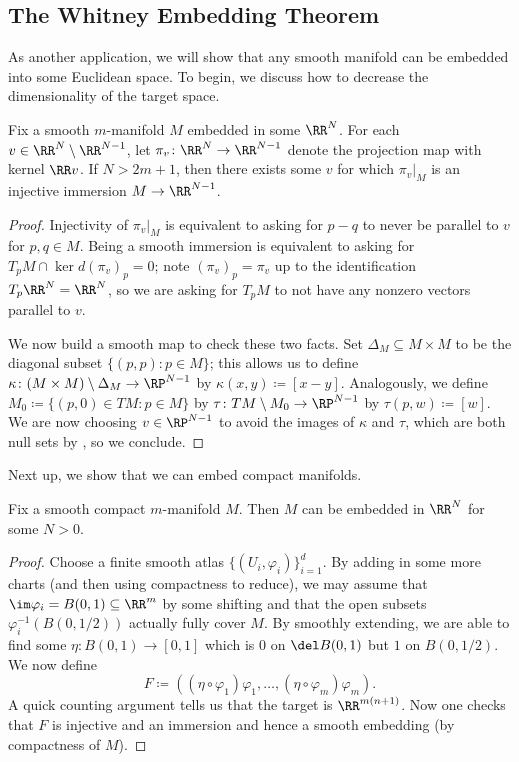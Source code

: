 \documentclass[../notes.tex]{subfiles}
\begin{document}
\subsection{The Whitney Embedding Theorem}
As another application, we will show that any smooth manifold can be embedded into some Euclidean space. To begin, we discuss how to decrease the dimensionality of the target space.
\begin{lemma}
	Fix a smooth $m$-manifold $M$ embedded in some $\RR^N$. For each $v\in\RR^N\setminus\RR^{N-1}$, let $\pi_v\colon\RR^N\to\RR^{N-1}$ denote the projection map with kernel $\RR v$. If $N>2m+1$, then there exists some $v$ for which $\pi_v|_M$ is an injective immersion $M\to\RR^{N-1}$.
\end{lemma}
\begin{proof}
	Injectivity of $\pi_v|_M$ is equivalent to asking for $p-q$ to never be parallel to $v$ for $p,q\in M$. Being a smooth immersion is equivalent to asking for $T_pM\cap\ker d(\pi_v)_p=0$; note $(\pi_v)_p=\pi_v$ up to the identification $T_p\RR^N=\RR^N$, so we are asking for $T_pM$ to not have any nonzero vectors parallel to $v$.

	We now build a smooth map to check these two facts. Set $\Delta_M\subseteq M\times M$ to be the diagonal subset $\{(p,p):p\in M\}$; this allows us to define $\kappa\colon(M\times M)\setminus\Delta_M\to\RP^{N-1}$ by $\kappa(x,y)\coloneqq[x-y]$. Analogously, we define $M_0\coloneqq\{(p,0)\in TM:p\in M\}$ by $\tau\colon TM\setminus M_0\to\RP^{N-1}$ by $\tau(p,w)\coloneqq[w]$. We are now choosing $v\in\RP^{N-1}$ to avoid the images of $\kappa$ and $\tau$, which are both null sets by , so we conclude.
\end{proof}
Next up, we show that we can embed compact manifolds.
\begin{lemma}
	Fix a smooth compact $m$-manifold $M$. Then $M$ can be embedded in $\RR^N$ for some $N>0$.
\end{lemma}
\begin{proof}
	Choose a finite smooth atlas $\{(U_i,\varphi_i)\}_{i=1}^d$. By adding in some more charts (and then using compactness to reduce), we may assume that $\im\varphi_i=B(0,1)\subseteq\RR^m$ by some shifting and that the open subsets $\varphi_i^{-1}(B(0,1/2))$ actually fully cover $M$. By smoothly extending, we are able to find some $\eta\colon B(0,1)\to[0,1]$ which is $0$ on $\del B(0,1)$ but $1$ on $B(0,1/2)$. We now define
	\[F\coloneqq((\eta\circ\varphi_1)\varphi_1,\ldots,(\eta\circ\varphi_m)\varphi_m).\]
	A quick counting argument tells us that the target is $\RR^{m(n+1)}$. Now one checks that $F$ is injective and an immersion and hence a smooth embedding (by compactness of $M$).
\end{proof}
\end{document}
